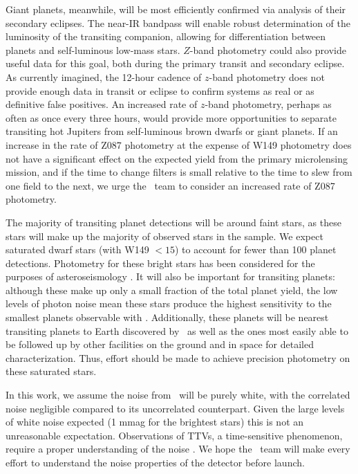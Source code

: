 Giant planets, meanwhile, will be most efficiently confirmed via analysis of their 
secondary eclipses. 
The near-IR bandpass will enable robust determination of the luminosity of the 
transiting companion, allowing for differentiation between planets and self-luminous 
low-mass stars. 
$Z$-band photometry could also provide useful data for this goal, both during the primary
transit and secondary eclipse. 
As currently imagined, the 12-hour cadence of $z$-band photometry does not provide enough
data in transit or eclipse to confirm systems as real or as definitive false positives.
An increased rate of $z$-band photometry, perhaps as often as once every three hours, 
would provide more opportunities to separate transiting hot Jupiters from self-luminous
brown dwarfs or giant planets.
If an increase in the rate of Z087 photometry at the expense of W149 photometry does not
have a significant effect on the expected yield from the primary microlensing mission, 
and if the time to change filters is small relative to the time to slew from one field to the 
next, we urge the \WF\ team
to consider an increased rate of Z087 photometry.



The majority of transiting planet detections will be around faint stars, as these stars
will make up the majority of observed stars in the sample.
We expect saturated dwarf stars (with W149 $< 15$) to account for fewer than 100 
planet detections. 
Photometry for these bright stars has been considered for the purposes of asteroseismology
\citep{Gould15}.
It will also be important for transiting planets: although these make up only a small
fraction of the total planet yield, the low levels of photon noise mean these stars 
produce the highest sensitivity to the smallest planets observable with \WF.
Additionally, these planets will be nearest transiting planets to Earth discovered by \WF\
as well as the ones most easily able to be followed up by other facilities on the ground
and in space for detailed characterization.
Thus, effort should be made to achieve precision photometry on these saturated stars.

In this work, we assume the noise from \WF\ will be purely white, with the correlated 
noise negligible compared to its uncorrelated counterpart.
Given the large levels of white noise expected (1 mmag for the brightest stars) this is
not an unreasonable expectation.
Observations of TTVs, a time-sensitive phenomenon, require a proper understanding of the
noise \citep{Pont06}.
We hope the \WF\ team will make every effort to understand the noise properties of the detector before launch.



